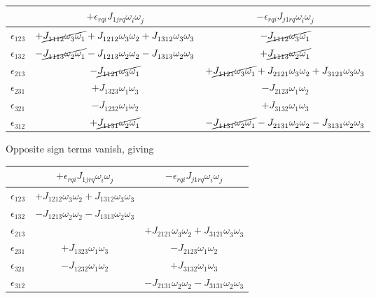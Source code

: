 \begin{table}[H]
\centering
 \begin{tabular}{||c | | c  | c||} 
 \hline
  & $+\epsilon_{rqi}J^{}_{1jrq}\omega^{}_{i}\omega^{}_{j}$ & $-\epsilon_{rqi}J^{}_{j1rq}\omega^{}_{i}\omega^{}_{j}   $\\ [1.5ex] 
 \hline\hline
 $\epsilon_{123}$ & $+\cancel{J^{}_{1112}\omega^{}_{3}\omega^{}_{1}}+J^{}_{1212}\omega^{}_{3}\omega^{}_{2}+J^{}_{1312}\omega^{}_{3}\omega^{}_{3}$ & $-\cancel{J^{}_{1112}\omega^{}_{3}\omega^{}_{1}} $\\  
 $\epsilon_{132}$ & $-\cancel{J^{}_{1113}\omega^{}_{2}\omega^{}_{1}}-J^{}_{1213}\omega^{}_{2}\omega^{}_{2}-J^{}_{1313}\omega^{}_{2}\omega^{}_{3}$ & $+\cancel{J^{}_{1113}\omega^{}_{2}\omega^{}_{1} } $\\
 $\epsilon_{213}$ & $-\cancel{J^{}_{1121}\omega^{}_{3}\omega^{}_{1}}$ & $+\cancel{J^{}_{1121}\omega^{}_{3}\omega^{}_{1}}+J^{}_{2121}\omega^{}_{3}\omega^{}_{2}+J^{}_{3121}\omega^{}_{3}\omega^{}_{3}   $\\
 $\epsilon_{231}$ & $+J^{}_{1323}\omega^{}_{1}\omega^{}_{3}$ & $-J^{}_{2123}\omega^{}_{1}\omega^{}_{2}$\\
 $\epsilon_{321}$ & $-J^{}_{1232}\omega^{}_{1}\omega^{}_{2}$ & $+J^{}_{3132}\omega^{}_{1}\omega^{}_{3}   $\\
 $\epsilon_{312}$ & $+\cancel{J^{}_{1131}\omega^{}_{2}\omega^{}_{1}}$ & $-\cancel{J^{}_{1131}\omega^{}_{2}\omega^{}_{1}} -J^{}_{2131}\omega^{}_{2}\omega^{}_{2} -J^{}_{3131}\omega^{}_{2}\omega^{}_{3}   $\\   [1ex] 
 \hline
 \end{tabular}
\end{table}
Opposite sign terms vanish, giving
\begin{table}[H]
\centering
 \begin{tabular}{||c | | c  | c||} 
 \hline
  & $+\epsilon_{rqi}J^{}_{1jrq}\omega^{}_{i}\omega^{}_{j}$ & $-\epsilon_{rqi}J^{}_{j1rq}\omega^{}_{i}\omega^{}_{j}   $\\ [1.5ex] 
 \hline\hline
 $\epsilon_{123}$ & $+J^{}_{1212}\omega^{}_{3}\omega^{}_{2}+J^{}_{1312}\omega^{}_{3}\omega^{}_{3}$ & $ $\\  
 $\epsilon_{132}$ & $-J^{}_{1213}\omega^{}_{2}\omega^{}_{2}-J^{}_{1313}\omega^{}_{2}\omega^{}_{3}$ & $ $\\
 $\epsilon_{213}$ & $ $ & $+J^{}_{2121}\omega^{}_{3}\omega^{}_{2}+J^{}_{3121}\omega^{}_{3}\omega^{}_{3}   $\\
 $\epsilon_{231}$ & $+J^{}_{1323}\omega^{}_{1}\omega^{}_{3}$ & $-J^{}_{2123}\omega^{}_{1}\omega^{}_{2}$\\
 $\epsilon_{321}$ & $-J^{}_{1232}\omega^{}_{1}\omega^{}_{2}$ & $+J^{}_{3132}\omega^{}_{1}\omega^{}_{3}   $\\
 $\epsilon_{312}$ & $ $ & $-J^{}_{2131}\omega^{}_{2}\omega^{}_{2} -J^{}_{3131}\omega^{}_{2}\omega^{}_{3}   $\\   [1ex] 
 \hline
 \end{tabular}
\end{table}
